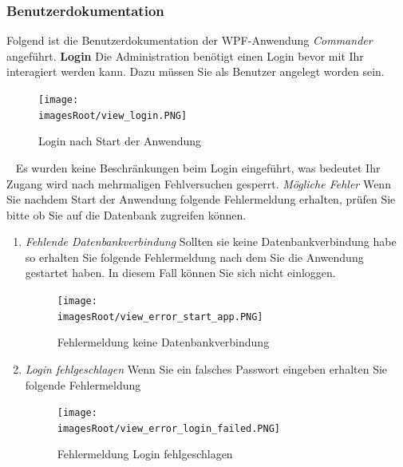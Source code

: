 \documentclass[11pt, a4paper, twoside]{article}   	%
\newcommand{\imagesRoot}{images}
\begin{document}
\subsubsection{Benutzerdokumentation}
Folgend ist die Benutzerdokumentation der WPF-Anwendung \emph{Commander} angeführt.
\newline
\newline
\textbf{Login}\newline
Die Administration benötigt einen Login bevor mit Ihr interagiert werden kann. Dazu müssen Sie als Benutzer angelegt worden sein.
\newline
\begin{figure}[h]
	\centering
	\texttt{[image: \\imagesRoot/view\_login.PNG]}
	\caption
	{Login nach Start der Anwendung}
\end{figure}
\ \newline
Es wurden keine Beschränkungen beim Login eingeführt, was bedeutet Ihr Zugang wird nach mehrmaligen Fehlversuchen gesperrt.
\newline
\newline
\emph{Mögliche Fehler}
\newline
\newline
Wenn Sie nachdem Start der Anwendung folgende Fehlermeldung erhalten, prüfen Sie bitte ob Sie auf die Datenbank zugreifen können.
\begin{enumerate}
	\item\emph{Fehlende Datenbankverbindung}
	\newline
	Sollten sie keine Datenbankverbindung habe so erhalten Sie folgende Fehlermeldung nach dem Sie die Anwendung gestartet haben. In diesem Fall können Sie sich nicht einloggen.
	\begin{figure}[h]
	\centering
	\texttt{[image: \\imagesRoot/view\_error\_start\_app.PNG]}
	\caption
	{Fehlermeldung keine Datenbankverbindung}
\end{figure}
\item\emph{Login fehlgeschlagen}
\newline
Wenn Sie ein falsches Passwort eingeben erhalten Sie folgende Fehlermeldung
\begin{figure}[h]
	\centering
	\texttt{[image: \\imagesRoot/view\_error\_login\_failed.PNG]}
	\caption
	{Fehlermeldung Login fehlgeschlagen}
\end{figure}
\end{enumerate}
\ \newpage
{}
\end{document}
